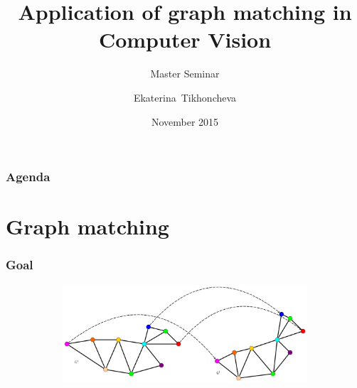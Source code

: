 \documentclass[hyperref={pdfpagelabels=false}]{beamer}
\title[Application of graph matching in Computer Vision]
	{Application of graph matching in Computer Vision}
\subtitle{Master Seminar}
\author[E.~Tikhoncheva] %
	{Ekaterina~Tikhoncheva}
\institute[Universities Here and There] %
	{University of Heidelberg\\
	Faculty of Mathematics and Computer Science \\
	Computer Vision group \\
	at\\
	Heidelberg Collaboratory for Image Processing
}
\date[2015]{November 2015}
\begin{document}
\begin{frame}
\titlepage
\end{frame}
\begin{frame}
\frametitle{Agenda}
\tableofcontents
\end{frame} 
\section{Graph matching} 
\begin{frame}
\frametitle{Goal}

\begin{figure}[h!]
    \begin{subfigure}[b]{\textwidth}
        \includegraphics[width=10cm]{fig/duck1_duck2.png}
    \end{subfigure}
\end{figure}
\end{frame}
\end{document}
